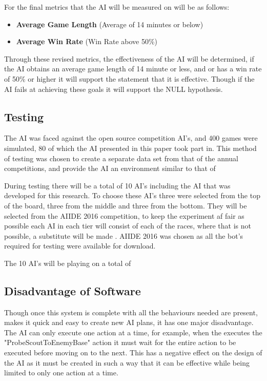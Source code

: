 \documentclass[journal]{IEEEtran}
\begin{document}
For the final metrics that the AI will be measured on will be as follows:
\begin{itemize}
	\item \textbf{Average Game Length} (Average of 14 minutes or below)
	\item \textbf{Average Win Rate} (Win Rate above 50\%)
\end{itemize}

Through these revised metrics, the effectiveness of the AI will be determined, if the AI obtains an average game length of 14 minute or less, and or has a win rate of 50\% or higher it will support the statement that it is effective. Though if the AI fails at achieving these goals it will support the NULL hypothesis.

\subsection{Testing}
The AI was faced against the open source competition AI's, and 400 games were simulated, 80 of which the AI presented in this paper took part in. This method of testing was chosen to create a separate data set from that of the annual competitions, and provide the AI an environment similar to that of 

During testing there will be a total of 10 AI's including the AI that was developed for this research. To choose these AI's three were selected from the top of the board, three from the middle and three from the bottom. They will be selected from the AIIDE 2016 competition, to keep the experiment af fair as possible each AI in each tier will consist of each of the races, where that is not possible, a substitute will be made \cite{2016}. AIIDE 2016 was chosen as all the bot's required for testing were available for download.

The 10 AI's will be playing on a total of 


\subsection{Disadvantage of Software}
Though once this system is complete with all the behaviours needed are present, makes it quick and easy to create new AI plans, it has one major disadvantage. The AI can only execute one action at a time, for example, when the executes the "ProbeScoutToEnemyBase" action it must wait for the entire action to be executed before moving on to the next. This has a negative effect on the design of the AI as it must be created in such a way that it can be effective while being limited to only one action at a time.
\end{document}
